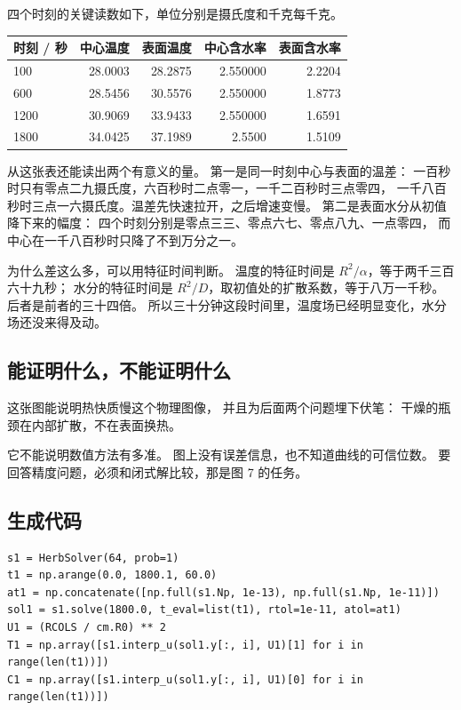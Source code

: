 \documentclass[11pt,a4paper]{article}
\begin{document}
四个时刻的关键读数如下，单位分别是摄氏度和千克每千克。

\begin{center}
\begin{tabular}{@{}lrrrr@{}}
\toprule
时刻 / 秒 & 中心温度 & 表面温度 & 中心含水率 & 表面含水率 \\
\midrule
100 & 28.0003 & 28.2875 & 2.550000 & 2.2204 \\
600 & 28.5456 & 30.5576 & 2.550000 & 1.8773 \\
1200 & 30.9069 & 33.9433 & 2.550000 & 1.6591 \\
1800 & 34.0425 & 37.1989 & 2.5500 & 1.5109 \\
\bottomrule
\end{tabular}
\end{center}

从这张表还能读出两个有意义的量。
第一是同一时刻中心与表面的温差：
一百秒时只有零点二九摄氏度，六百秒时二点零一，一千二百秒时三点零四，
一千八百秒时三点一六摄氏度。温差先快速拉开，之后增速变慢。
第二是表面水分从初值降下来的幅度：
四个时刻分别是零点三三、零点六七、零点八九、一点零四，
而中心在一千八百秒时只降了不到万分之一。

为什么差这么多，可以用特征时间判断。
温度的特征时间是 $R^2/\alpha$，等于两千三百六十九秒；
水分的特征时间是 $R^2/D$，取初值处的扩散系数，等于八万一千秒。
后者是前者的三十四倍。
所以三十分钟这段时间里，温度场已经明显变化，水分场还没来得及动。

\subsection{能证明什么，不能证明什么}

这张图能说明热快质慢这个物理图像，
并且为后面两个问题埋下伏笔：
干燥的瓶颈在内部扩散，不在表面换热。

它不能说明数值方法有多准。
图上没有误差信息，也不知道曲线的可信位数。
要回答精度问题，必须和闭式解比较，那是图 7 的任务。

\subsection{生成代码}

\begin{lstlisting}
s1 = HerbSolver(64, prob=1)
t1 = np.arange(0.0, 1800.1, 60.0)
at1 = np.concatenate([np.full(s1.Np, 1e-13), np.full(s1.Np, 1e-11)])
sol1 = s1.solve(1800.0, t_eval=list(t1), rtol=1e-11, atol=at1)
U1 = (RCOLS / cm.R0) ** 2
T1 = np.array([s1.interp_u(sol1.y[:, i], U1)[1] for i in range(len(t1))])
C1 = np.array([s1.interp_u(sol1.y[:, i], U1)[0] for i in range(len(t1))])
\end{lstlisting}
\end{document}
